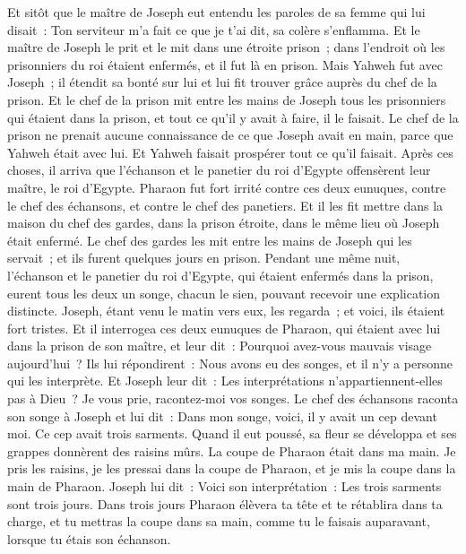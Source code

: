 \begin{multicols}{2}
Et sitôt que le maître de Joseph eut entendu les paroles de sa femme qui lui disait~: Ton serviteur m'a fait ce que je t'ai dit, sa colère s'enflamma.
Et le maître de Joseph le prit et le mit dans une étroite prison~; dans l'endroit où les prisonniers du roi étaient enfermés, et il fut là en prison.
Mais Yahweh fut avec Joseph~; il étendit sa bonté sur lui et lui fit trouver grâce auprès du chef de la prison.
Et le chef de la prison mit entre les mains de Joseph tous les prisonniers qui étaient dans la prison, et tout ce qu'il y avait à faire, il le faisait.
Le chef de la prison ne prenait aucune connaissance de ce que Joseph avait en main, parce que Yahweh était avec lui. Et Yahweh faisait prospérer tout ce qu'il faisait.
\VerseOne{}Après ces choses, il arriva que l'échanson et le panetier du roi d'Egypte offensèrent leur maître, le roi d'Egypte.
Pharaon fut fort irrité contre ces deux eunuques, contre le chef des échansons, et contre le chef des panetiers.
Et il les fit mettre dans la maison du chef des gardes, dans la prison étroite, dans le même lieu où Joseph était enfermé.
Le chef des gardes les mit entre les mains de Joseph qui les servait~; et ils furent quelques jours en prison.
Pendant une même nuit, l'échanson et le panetier du roi d'Egypte, qui étaient enfermés dans la prison, eurent tous les deux un songe, chacun le sien, pouvant recevoir une explication distincte.
Joseph, étant venu le matin vers eux, les regarda~; et voici, ils étaient fort tristes.
Et il interrogea ces deux eunuques de Pharaon, qui étaient avec lui dans la prison de son maître, et leur dit~: Pourquoi avez-vous mauvais visage aujourd'hui~?
Ils lui répondirent~: Nous avons eu des songes, et il n'y a personne qui les interprète. Et Joseph leur dit~: Les interprétations n'appartiennent-elles pas à Dieu~? Je vous prie, racontez-moi vos songes.
Le chef des échansons raconta son songe à Joseph et lui dit~: Dans mon songe, voici, il y avait un cep devant moi.
Ce cep avait trois sarments. Quand il eut poussé, sa fleur se développa et ses grappes donnèrent des raisins mûrs.
La coupe de Pharaon était dans ma main. Je pris les raisins, je les pressai dans la coupe de Pharaon, et je mis la coupe dans la main de Pharaon.
Joseph lui dit~: Voici son interprétation~: Les trois sarments sont trois jours.
Dans trois jours Pharaon élèvera ta tête et te rétablira dans ta charge, et tu mettras la coupe dans sa main, comme tu le faisais auparavant, lorsque tu étais son échanson.

\end{multicols}
